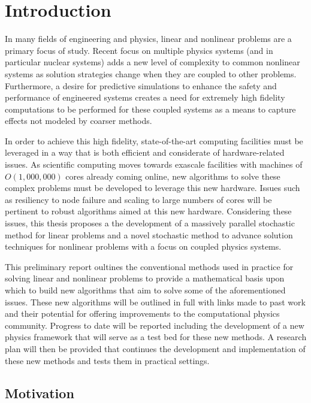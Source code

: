 \chapter{Introduction}
\label{ch:introduction}

In many fields of engineering and physics, linear and nonlinear
problems are a primary focus of study. Recent focus on multiple
physics systems (and in particular nuclear systems) adds a new level
of complexity to common nonlinear systems as solution strategies
change when they are coupled to other problems. Furthermore, a desire
for predictive simulations to enhance the safety and performance of
engineered systems creates a need for extremely high fidelity
computations to be performed for these coupled systems as a means to
capture effects not modeled by coarser methods.

In order to achieve this high fidelity, state-of-the-art computing
facilities must be leveraged in a way that is both efficient and
considerate of hardware-related issues. As scientific computing moves
towards exascale facilities with machines of $O(1,000,000)$ cores
already coming online, new algorithms to solve these complex problems
must be developed to leverage this new hardware. Issues such as
resiliency to node failure and scaling to large numbers of cores will
be pertinent to robust algorithms aimed at this new
hardware. Considering these issues, this thesis proposes a the
development of a massively parallel stochastic method for linear
problems and a novel stochastic method to advance solution techniques
for nonlinear problems with a focus on coupled physics systems.

This preliminary report oultines the conventional methods used in
practice for solving linear and nonlinear problems to provide a
mathematical basis upon which to build new algorithms that aim to
solve some of the aforementioned issues. These new algorithms will be
outlined in full with links made to past work and their potential for
offering improvements to the computational physics community. Progress
to date will be reported including the development of a new physics
framework that will serve as a test bed for these new methods. A
research plan will then be provided that continues the development and
implementation of these new methods and tests them in practical
settings.

\section{Motivation}
\label{sec:motivation}

